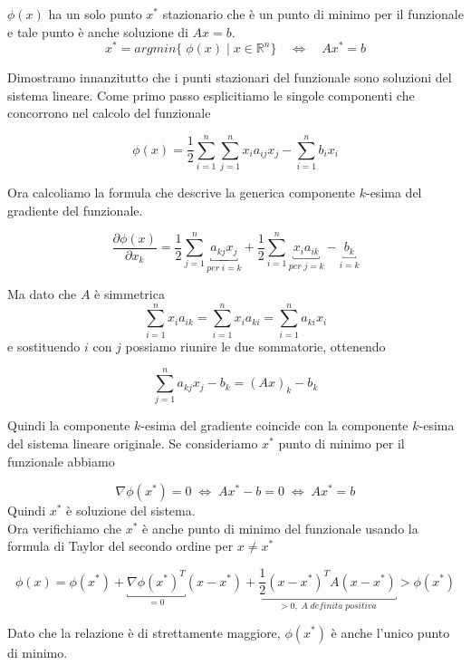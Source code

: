 \begin{theo} $\phi(x)$ ha un solo punto $x^{*}$ stazionario che \`e un
punto di minimo per il funzionale e tale punto \`e anche soluzione di
$Ax= b$.
$$x^{*} = argmin\{\; \phi(x) \;|\;  x \in \mathbb{R}^{n} \}
 \quad \Longleftrightarrow \quad Ax^{*} = b$$
\end{theo}

\begin{thproof} Dimostramo innanzitutto che i punti stazionari del
funzionale sono soluzioni del sistema lineare.  Come primo passo
esplicitiamo le singole componenti che concorrono nel calcolo del
funzionale

$$\phi(x)=\frac{1}{2} \displaystyle \sum_{i=1}^{n} \displaystyle \sum_{j=1}^{n} x_{i} a_{ij} x_{j} -
\displaystyle \sum_{i=1}^{n} b_{i} x_{i}
$$

Ora calcoliamo la formula che descrive la generica componente
$k$-esima del gradiente del funzionale.

$$ \frac{\partial \phi(x)}{\partial x_{k}}
= \frac{1}{2}\displaystyle \sum_{j=1}^{n}\underbracket{ a_{kj}
x_{j}}_{per\; i=k} + \frac{1}{2} \displaystyle \sum_{i=1}^{n}
\underbracket{x_{i} a_{ik}}_{per\; j=k} - \underbracket{b_{k} }_{i=k}
$$

Ma dato che $A$ \`e simmetrica $$\displaystyle \sum_{i=1}^{n}x_{i}
a_{ik} =\displaystyle \sum_{i=1}^{n} x_{i} a_{ki} = \displaystyle
\sum_{i=1}^{n} a_{ki} x_{i}$$ e sostituendo $i$ con $j$ possiamo
riunire le due sommatorie, ottenendo

$$
\displaystyle \sum_{j=1}^{n} a_{kj} x_{j} - b_{k} = (Ax)_{k} - b_{k}
$$

Quindi la componente $k$-esima del gradiente coincide con la
componente $k$-esima del sistema lineare originale.  Se consideriamo
$x^{*}$ punto di minimo per il funzionale abbiamo

$$
\nabla \phi (x^{*})=0 \; \Longleftrightarrow \; Ax^{*}-b=0 \;
\Longleftrightarrow \; Ax^{*}=b
$$
Quindi $x^{*}$ \`e soluzione del sistema. \\ Ora verifichiamo che
$x^{*}$ \`e anche punto di minimo del funzionale usando la formula di
Taylor del secondo ordine per $x \neq x^{*} $

$$
\phi(x) = \phi(x^{*}) + \underbracket{\nabla \phi(x^{*})^{T}}_{= 0 }
(x - x^{*}) + \underbracket{\frac{1}{2} (x-x^{*})^{T} A (x-x^{*})}_{>
0 , \;A \;definita\; positiva} > \phi(x^{*})
$$

Dato che la relazione \`e di strettamente maggiore, $ \phi(x^{*}) $ \`e
anche l'unico punto di minimo.


\end{thproof}

